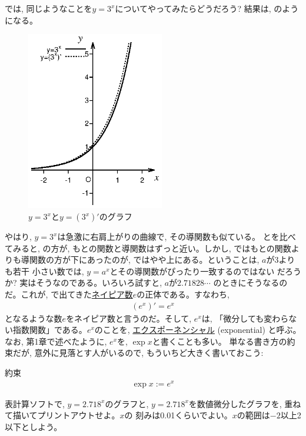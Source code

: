 では, 同じようなことを$y=3^x$についてやってみたらどうだろう?
結果は, のようになる。
\begin{figure}[h]
    \centering
    \includegraphics[width=6.0cm]{y3powx.eps}
    \caption{$y=3^x$と$y=(3^x)'$のグラフ}\label{fig:y3powx}
\end{figure}
やはり, $y=3^x$は急激に右肩上がりの曲線で, その導関数も似ている。
とを比べてみると, 
の方が, もとの関数と導関数はずっと近い。しかし, 
ではもとの関数よりも導関数の方が下にあったのが, 
ではやや上にある。ということは, $a$が3よりも若干
小さい数では, $y=a^x$とその導関数がぴったり一致するのではない
だろうか? 実はそうなのである。いろいろ試すと, $a$が$2.71828\cdots$
のときにそうなるのだ。これが, 
で出てきた\underline{ネイピア数}$e$の正体である。すなわち, 
\begin{eqnarray}
(e^x)'=e^x\label{eq:exp_diff}
\end{eqnarray}
となるような数$e$をネイピア数と言うのだ。そして, $e^x$は, 
「微分しても変わらない指数関数」である。$e^x$のことを, \underline{エクスポーネンシャル} 
(exponential) と呼ぶ。
なお, 第1章で述べたように, $e^x$を, $\exp x$と書くことも多い。
単なる書き方の約束だが, 意外に見落とす人がいるので, もういちど大きく書いておこう:

\begin{itembox}{約束}
\begin{eqnarray}\exp x :=e^x\end{eqnarray}
\end{itembox}

\begin{q}\label{q:exp_graph0} 表計算ソフトで, $y=2.718^x$のグラフと, 
$y=2.718^x$を数値微分したグラフを, 重ねて描いてプリントアウトせよ。$x$の
刻みは0.01くらいでよい。$x$の範囲は$-2$以上2以下としよう。\end{q}

